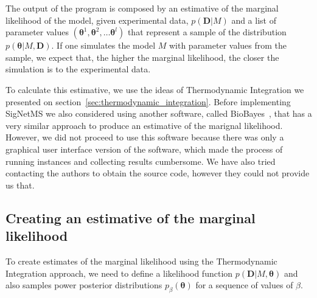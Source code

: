 The output of the program is composed by an estimative of the marginal
likelihood of the model, given experimental data, $p({\bm D} | M)$ and a
list of parameter values $({\bm \theta}^1, {\bm \theta}^2, \ldots {\bm
\theta}^l)$ that represent a sample of the distribution $p({\bm \theta}
| M, {\bm D})$. If one simulates the model $M$ with parameter values
from the sample, we expect that, the higher the marginal likelihood, the
closer the simulation is to the experimental data.

To calculate this estimative, we use the ideas of Thermodynamic
Integration we presented on section~\ref{sec:thermodynamic_integration}.
Before implementing SigNetMS we also considered using another software,
called BioBayes~\cite{Vyshemirsky2008}, that has a very similar approach
to produce an estimative of the marignal likelihood. However, we did not
proceed to use this software because there was only a graphical user
interface version of the software, which made the process of running
instances and collecting results cumbersome. We have also tried
contacting the authors to obtain the source code, however they could not
provide us that.

\subsection{Creating an estimative of the marginal likelihood}


To create estimates of the marginal likelihood using the Thermodynamic
Integration approach, we need to define a likelihood function $p({\bm
D}| M, {\bm \theta})$ and also samples power posterior distributions
$p_\beta({\bm \theta})$ for a sequence of values of $\beta$.

